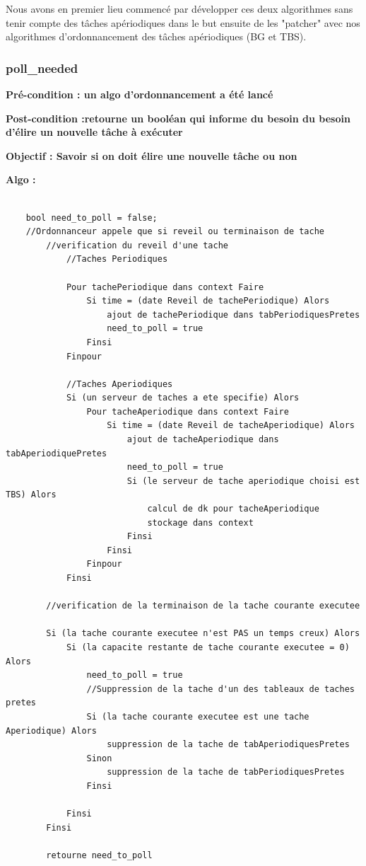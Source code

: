 			Nous avons en premier lieu commencé par développer ces deux algorithmes sans tenir compte des tâches apériodiques dans le but ensuite de les "patcher" avec nos algorithmes d'ordonnancement des tâches apériodiques (BG et TBS).
			
			
			\subsubsection{poll\_needed}
				\label{sec:algo_poll}

				\textbf{Pré-condition : un algo d'ordonnancement a été lancé} 
				
				\textbf{Post-condition :retourne un booléan qui informe du besoin du besoin d'élire un nouvelle tâche à exécuter} 
				
				\textbf{Objectif : Savoir si on doit élire une nouvelle tâche ou non} 
				
				\textbf{Algo :} 
					\begin{lstlisting}
					
	bool need_to_poll = false;
	//Ordonnanceur appele que si reveil ou terminaison de tache
		//verification du reveil d'une tache
			//Taches Periodiques
			
			Pour tachePeriodique dans context Faire
				Si time = (date Reveil de tachePeriodique) Alors
					ajout de tachePeriodique dans tabPeriodiquesPretes
					need_to_poll = true
				Finsi
			Finpour
			
			//Taches Aperiodiques
			Si (un serveur de taches a ete specifie) Alors
				Pour tacheAperiodique dans context Faire
					Si time = (date Reveil de tacheAperiodique) Alors
						ajout de tacheAperiodique dans tabAperiodiquePretes
						need_to_poll = true
						Si (le serveur de tache aperiodique choisi est TBS) Alors
							calcul de dk pour tacheAperiodique
							stockage dans context
						Finsi
					Finsi
				Finpour
			Finsi
			
		//verification de la terminaison de la tache courante executee
		
		Si (la tache courante executee n'est PAS un temps creux) Alors
			Si (la capacite restante de tache courante executee = 0) Alors
				need_to_poll = true
				//Suppression de la tache d'un des tableaux de taches pretes
				Si (la tache courante executee est une tache Aperiodique) Alors
					suppression de la tache de tabAperiodiquesPretes
				Sinon
					suppression de la tache de tabPeriodiquesPretes
				Finsi
		
			Finsi
		Finsi
		
		retourne need_to_poll
				
					\end{lstlisting}
				
